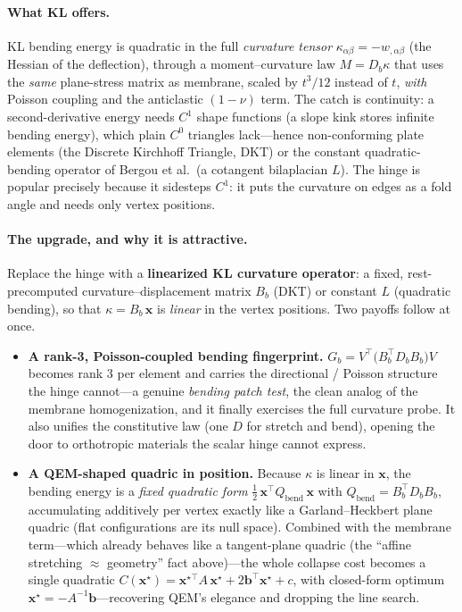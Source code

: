 \paragraph{What KL offers.}
KL bending energy is quadratic in the full \emph{curvature tensor} $\kappa_{\alpha\beta}=-w_{,\alpha\beta}$ (the Hessian of the deflection), through a moment--curvature law $M=D_b\kappa$ that uses the \emph{same} plane-stress matrix as membrane, scaled by $t^3/12$ instead of $t$, \emph{with} Poisson coupling and the anticlastic $(1-\nu)$ term.
The catch is continuity: a second-derivative energy needs $C^1$ shape functions (a slope kink stores infinite bending energy), which plain $C^0$ triangles lack---hence non-conforming plate elements (the Discrete Kirchhoff Triangle, DKT) or the constant quadratic-bending operator of Bergou et al.\ (a cotangent bilaplacian $L$).
The hinge is popular precisely because it sidesteps $C^1$: it puts the curvature on edges as a fold angle and needs only vertex positions.

\paragraph{The upgrade, and why it is attractive.}
Replace the hinge with a \textbf{linearized KL curvature operator}: a fixed, rest-precomputed curvature--displacement matrix $B_b$ (DKT) or constant $L$ (quadratic bending), so that $\kappa=B_b\,\mathbf x$ is \emph{linear} in the vertex positions.
Two payoffs follow at once.
\begin{itemize}
  \item \textbf{A rank-3, Poisson-coupled bending fingerprint.}
        $G_b=V^\top\!\big(B_b^\top D_b B_b \big)V$ becomes rank $3$ per element and carries the directional / Poisson structure the hinge cannot---a genuine \emph{bending patch test}, the clean analog of the membrane homogenization, and it finally exercises the full curvature probe.
        It also unifies the constitutive law (one $D$ for stretch and bend), opening the door to orthotropic materials the scalar hinge cannot express.
  \item \textbf{A QEM-shaped quadric in position.}
        Because $\kappa$ is linear in $\mathbf x$, the bending energy is a \emph{fixed quadratic form} $\tfrac12\,\mathbf x^\top Q_{\text{bend}}\, \mathbf x$ with $Q_{\text{bend}}=B_b^\top D_b B_b$, accumulating additively per vertex exactly like a Garland--Heckbert plane quadric (flat configurations are its null space).
        Combined with the membrane term---which already behaves like a tangent-plane quadric (the ``affine stretching $\approx$ geometry'' fact above)---the whole collapse cost becomes a single quadratic $C(\mathbf x^\star)=\mathbf x^{\star\top}\!A\,\mathbf x^\star+2\mathbf b^\top \mathbf x^\star+c$, with closed-form optimum $\mathbf x^\star=-A^{-1}\mathbf b$---recovering QEM's elegance and dropping the line search.
\end{itemize}

